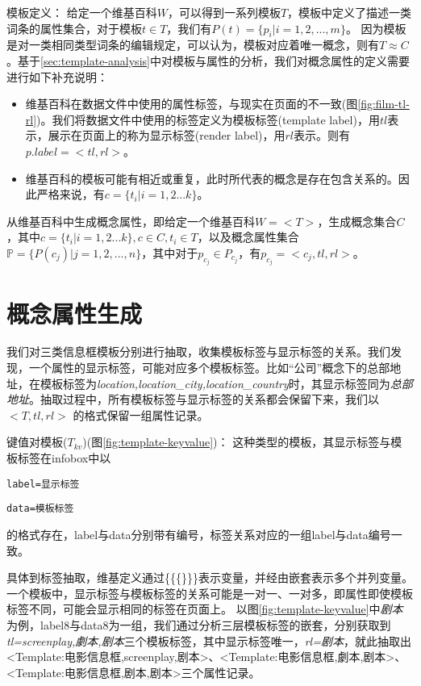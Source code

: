 {\heiti 模板定义：} 
给定一个维基百科$W$，可以得到一系列模板$T$，模板中定义了描述一类词条的属性集合，对于模板$t \in T$，我们有$P(t)=\{p_{i}|i=1,2,...,m\}$。
因为模板是对一类相同类型词条的编辑规定，可以认为，模板对应着唯一概念，则有$T \approx C$。基于\ref{sec:template-analysis}中对模板与属性的分析，我们对概念属性的定义需要进行如下补充说明：
\begin{itemize}
\item 维基百科在数据文件中使用的属性标签，与现实在页面的不一致(图\ref{fig:film-tl-rl})。我们将数据文件中使用的标签定义为模板标签(template label)，用$tl$表示，展示在页面上的称为显示标签(render label)，用$rl$表示。则有$p.label = <tl, rl>$。
\item 维基百科的模板可能有相近或重复，此时所代表的概念是存在包含关系的。因此严格来说，有$c = \{t_i|i=1,2...k\}$。
\end{itemize}

从维基百科中生成概念属性，即给定一个维基百科$W = <T>$，生成概念集合$C$，其中$c = \{t_i|i=1,2...k\}, c \in C, t_i \in T$，以及概念属性集合$\mathbb{P} = \{P(c_j)| j = 1,2,...,n\}$，其中对于$p_{c_j} \in P_{c_j}$，有$p_{c_j} = <c_j, tl, rl>$。

\section{概念属性生成}
\label{sec:property-extraction}

我们对三类信息框模板分别进行抽取，收集模板标签与显示标签的关系。我们发现，一个属性的显示标签，可能对应多个模板标签。比如“公司”概念下的总部地址，在模板标签为\textit{location,location\_city,location\_country}时，其显示标签同为\textit{总部地址}。抽取过程中，所有模板标签与显示标签的关系都会保留下来，我们以$<T, tl, rl>$ 的格式保留一组属性记录。

{\heiti 键值对模板($T_{kv}$)(图\ref{fig:template-keyvalue})：} 这种类型的模板，其显示标签与模板标签在infobox中以

\begin{center}
\verb"label=显示标签"

\verb"data=模板标签"
\end{center}
的格式存在，label与data分别带有编号，标签关系对应的一组label与data编号一致。

具体到标签抽取，维基定义通过\{\{\{\}\}\}表示变量，并经由嵌套表示多个并列变量。
一个模板中，显示标签与模板标签的关系可能是一对一、一对多，即属性即使模板标签不同，可能会显示相同的标签在页面上。
以图\ref{fig:template-keyvalue}中\textit{剧本}为例，label8与data8为一组，我们通过分析三层模板标签的嵌套，分别获取到\textit{tl=screenplay,劇本,剧本}三个模板标签，其中显示标签唯一，\textit{rl=剧本}，就此抽取出<Template:电影信息框,screenplay,剧本>、<Template:电影信息框,劇本,剧本>、<Template:电影信息框,剧本,剧本>三个属性记录。

